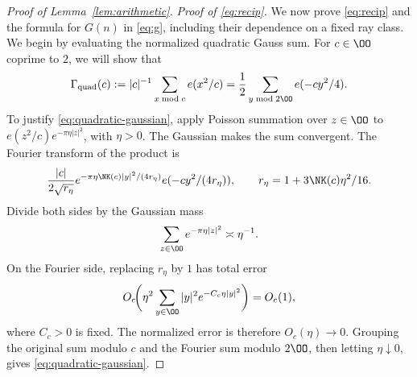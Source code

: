 \begin{proof}[Proof of Lemma~\ref{lem:arithmetic}]
\par\noindent\textit{Proof of \eqref{eq:recip}.}\quad
We now prove \eqref{eq:recip} and the formula for $G(n)$ in
\eqref{eq:g}, including their dependence on a fixed ray class.
We begin by evaluating the normalized quadratic Gauss sum.
For $c\in\OO$ coprime to $2$, we will show that
\begin{equation}\label{eq:quadratic-gaussian}
 \Gamma_{\rm quad}(c):=|c|^{-1}\sum_{x\bmod c}e(x^2/c)
       =\frac12\sum_{y\bmod2\OO}e(-cy^2/4).
\end{equation}
To justify \eqref{eq:quadratic-gaussian}, apply Poisson summation over
$z\in\OO$ to $e(z^2/c)e^{-\pi\eta|z|^2}$, with $\eta>0$.
The Gaussian makes the sum convergent. The Fourier transform of the product is
\[
 \frac{|c|}{2\sqrt{r_\eta}}
 e^{-\pi\eta \NK(c)|y|^2/(4r_\eta)}e(-cy^2/(4r_\eta)),
 \qquad r_\eta=1+3\NK(c)\eta^2/16.
\]
Divide both sides by the Gaussian mass
\[
 \sum_{z\in\OO}e^{-\pi\eta|z|^2}\asymp\eta^{-1}.
\]
On the Fourier side, replacing $r_\eta$ by $1$ has total error
\[
 O_c\!\biggl(\eta^2\sum_{y\in\OO}|y|^2e^{-C_c\eta|y|^2}\biggr)
 =O_c(1),
\]
where $C_c>0$ is fixed. The normalized error is therefore
$O_c(\eta)\to0$. Grouping the original sum modulo $c$ and the
Fourier sum modulo $2\OO$, then letting $\eta\downarrow0$, gives
\eqref{eq:quadratic-gaussian}.


\end{proof}
